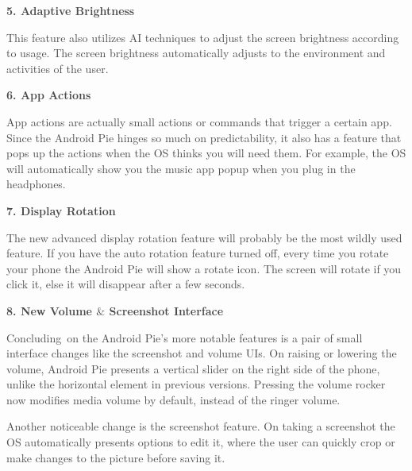 \documentclass[12pt]{article}
\begin{document}
\textbf{\textcolor[HTML]{4A4A4A}{5. Adaptive Brightness}}\par

\textcolor[HTML]{4A4A4A}{This feature also utilizes AI techniques to adjust the screen brightness according to usage. The screen brightness automatically adjusts to the environment and activities of the user.}\par


\vspace{\baselineskip}

\vspace{\baselineskip}
\textbf{\textcolor[HTML]{4A4A4A}{6. App Actions}}\par

\textcolor[HTML]{4A4A4A}{App actions are actually small actions or commands that trigger a certain app. Since the Android Pie hinges so much on predictability, it also has a feature that pops up the actions when the OS thinks you will need them. For example, the OS will automatically show you the music app popup when you plug in the headphones.}\par

\textbf{\textcolor[HTML]{4A4A4A}{7. Display Rotation}}\par

\textcolor[HTML]{4A4A4A}{The new advanced display rotation feature will probably be the most wildly used feature. If you have the auto rotation feature turned off, every time you rotate your phone the Android Pie will show a rotate icon. The screen will rotate if you click it, else it will disappear after a few seconds.}\par

\textbf{\textcolor[HTML]{4A4A4A}{8. New Volume $\&$  Screenshot Interface}}\par

\textcolor[HTML]{4A4A4A}{Concluding\ on the Android Pie's more notable features is a pair of small interface changes like the screenshot and volume UIs. On raising or lowering the volume, Android Pie presents a vertical slider on the right side of the phone, unlike the horizontal element in previous versions. Pressing the volume rocker now modifies media volume by default, instead of the ringer volume.  }\par

\textcolor[HTML]{4A4A4A}{Another noticeable change is the screenshot feature. On taking a screenshot the OS automatically presents options to edit it, where the user can quickly crop or make changes to the picture before saving it.}\par
\end{document}
